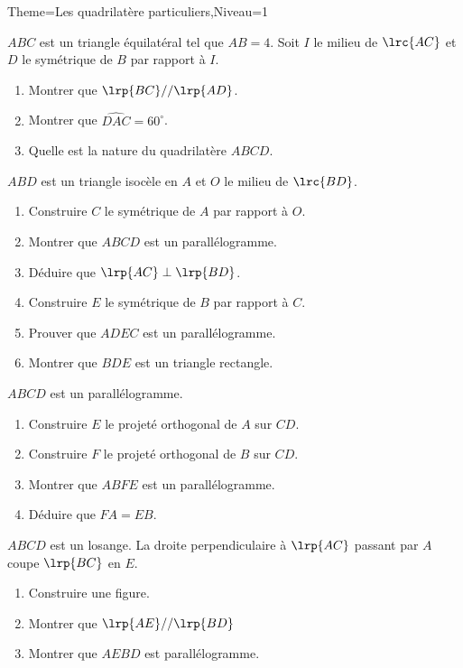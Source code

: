 \documentclass[a4paper,12pt]{article}
\begin{document}
\begin{Maquette}[Fiche]{Theme=Les quadrilatère particuliers,Niveau=1}
\begin{exercice}%
$ABC$ est un triangle équilatéral tel que $AB=4$. Soit $I$ le milieu de $\lrc{AC}$ et $D$ le symétrique de $B$ par rapport à $I$.
\begin{enumerate}
\item Montrer que $\lrp{BC}//\lrp{AD}$.
\item Montrer que $\widehat{DAC}=60^{\circ}$.
\item Quelle est la nature du quadrilatère $ABCD$.
\end{enumerate}
\end{exercice}

\begin{exercice}
$ABD$ est un triangle isocèle en $A$ et $O$ le milieu de $\lrc{BD}$.
\begin{enumerate}
\item Construire $C$ le symétrique de $A$ par rapport à $O$.
\item Montrer que $ABCD$ est un parallélogramme.
\item Déduire que $\lrp{AC}\perp\lrp{BD}$.
\item Construire $E$ le symétrique de $B$ par rapport à $C$.
\item Prouver que $ADEC$ est un parallélogramme.
\item Montrer que $BDE$ est un triangle rectangle.
\end{enumerate}
\end{exercice}

\begin{exercice}
$ABCD$ est un parallélogramme.
\begin{enumerate}
\item Construire $E$ le projeté orthogonal de $A$ sur $CD$.
\item Construire $F$ le projeté orthogonal de $B$ sur $CD$.
\item Montrer que $ABFE$ est un parallélogramme.
\item Déduire que $FA=EB$.
\end{enumerate}
\end{exercice}

\begin{exercice}
$ABCD$ est un losange. La droite perpendiculaire à $\lrp{AC}$ passant par $A$ coupe $\lrp{BC}$ en $E$.
\begin{enumerate}
\item Construire une figure.
\item Montrer que $\lrp{AE}//\lrp{BD}$
\item Montrer que $AEBD$ est parallélogramme.
\end{enumerate}
\end{exercice}


\end{Maquette}
\end{document}
